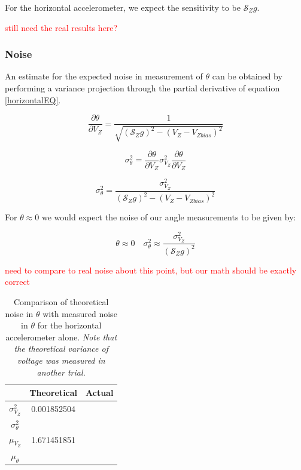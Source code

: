 \documentclass{article}
\newcommand{\xxx}[1]{\textcolor{red}{#1}}
\theoremstyle{plain}
\theoremstyle{definition}
\theoremstyle{remark}
\newcommand{\Sens}{\mathcal{S}}
\begin{document}
For the horizontal accelerometer, we expect the sensitivity to be $\Sens_{Z} g$. 

\xxx{still need the real results here?}

\subsubsection{Noise}

An estimate for the expected noise in measurement of $\theta$ can be obtained by performing a variance projection through the partial derivative of equation \ref{horizontalEQ}.

$$ \frac{\partial \theta}{\partial V_{Z}} =  \frac{1}{\sqrt{(\Sens_{Z} g)^2 - (V_{Z} - V_{Zbias})^2}}$$

$$ \sigma^2_{\theta} = \frac{\partial \theta}{\partial V_{Z}} \sigma^2_{V_{Z}} \frac{\partial \theta}{\partial V_{Z}} $$

$$ \sigma^2_{\theta} = \frac{\sigma^2_{V_{Z}}}{(\Sens_{Z} g)^2 - (V_{Z} - V_{Zbias})^2}$$

For $\theta \approx 0$ we would expect the noise of our angle measurements to be given by:

$$ \theta \approx 0 \quad \sigma^2_{\theta} \approx \frac{\sigma^2_{V_{Z}}}{(\Sens_{Z} g)^2}$$

\xxx{need to compare to real noise about this point, but our math should be exactly correct}

\begin{table}
\begin{center}
    \begin{tabular}{|c|c|c|}
        \hline
        ~                   & Theoretical  & Actual \\ \hline
        $\sigma^2_{V_{Z}}$    & 0.001852504            & ~      \\ 
        $\sigma^2_{\theta}$ & ~            & ~      \\ 
        $\mu_{V_{Z}}$       & 1.671451851            & ~      \\ 
        $\mu_{\theta}$      & ~            & ~      \\
        \hline
    \end{tabular}
\label{Noise_horizontal_T}
\caption{Comparison of theoretical noise in $\theta$ with measured noise in $\theta$ for the horizontal accelerometer alone. \emph{Note that the theoretical variance of voltage was measured in another trial.}}
\end{center}
\end{table}
\end{document}
